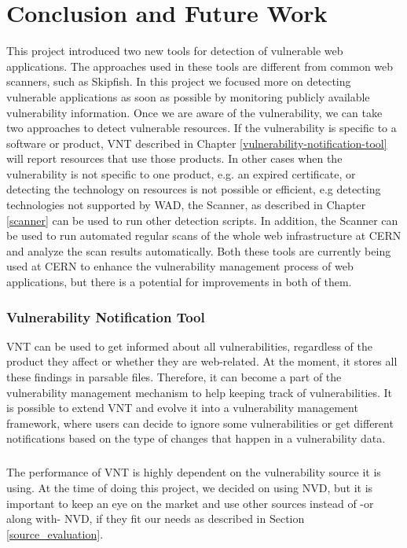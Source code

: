 \chapter{Conclusion and Future Work}
\label{conclusion-and-future-work}
\thispagestyle{empty}
This project introduced two new tools for detection of vulnerable web applications. The approaches used in these tools are different from common web scanners, such as Skipfish. In this project we focused more on detecting vulnerable applications as soon as possible by monitoring publicly available vulnerability information. Once we are aware of the vulnerability, we can take two approaches to detect vulnerable resources. If the vulnerability is specific to a software or product, VNT described in Chapter \ref{vulnerability-notification-tool} will report resources that use those products. In other cases when the vulnerability is not specific to one product, e.g. an expired certificate, or detecting the technology on resources is not possible or efficient, e.g detecting technologies not supported by WAD, the Scanner, as described in Chapter \ref{scanner} can be used to run other detection scripts. In addition, the Scanner can be used to run automated regular scans of the whole web infrastructure at CERN and analyze the scan results automatically. Both these tools are currently being used at CERN to enhance the vulnerability management process of web applications, but there is a potential for improvements in both of them. 
 
\subsection{Vulnerability Notification Tool}
VNT can be used to get informed about all vulnerabilities, regardless of the product they affect or whether they are web-related. At the moment, it stores all these findings in parsable files. Therefore, it can become a part of the vulnerability management mechanism to help keeping track of vulnerabilities. It is possible to extend VNT and evolve it into a vulnerability management framework, where users can decide to ignore some vulnerabilities or get different notifications based on the type of changes that happen in a vulnerability data.
\paragraph{}
The performance of VNT is highly dependent on the vulnerability source it is using. At the time of doing this project, we decided on using NVD,  but it is important to keep an eye on the market and use other sources instead of -or along with- NVD, if they fit our needs as described in Section \ref{source_evaluation}. 

